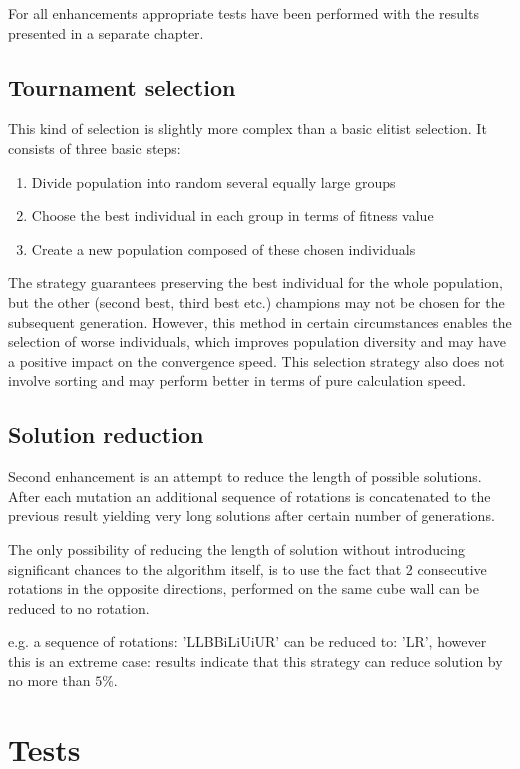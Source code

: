 \documentclass[a4paper]{article}
\begin{document}
For all enhancements appropriate tests have been performed with the results presented in a separate chapter.

\subsection{Tournament selection}
This kind of selection is slightly more complex than a basic elitist selection. It consists of three basic steps:
\begin{enumerate}
\item Divide population into random several equally large groups
\item Choose the best individual in each group in terms of fitness value
\item Create a new population composed of these chosen individuals
\end{enumerate}

The strategy guarantees preserving the best individual for the whole population, but the other (second best, third best etc.) champions may not be chosen for the subsequent generation.
However, this method in certain circumstances enables the selection of worse individuals, which improves population diversity and may have a positive impact on the convergence speed.
This selection strategy also does not involve sorting and may perform better in terms of pure calculation speed.

\subsection{Solution reduction}
Second enhancement is an attempt to reduce the length of possible solutions. After each mutation an additional sequence of rotations is concatenated to the previous result yielding very long solutions after certain number of generations.

The only possibility of reducing the length of solution without introducing significant chances to the algorithm itself,
is to use the fact that 2 consecutive rotations in the opposite directions, performed on the same cube wall can be reduced to no rotation.

e.g. a sequence of rotations: 'LLBBiLiUiUR' can be reduced to: 'LR', however this is an extreme case: results indicate that this strategy can reduce solution by no more than $5\%$.

\section{Tests}
\end{document}
